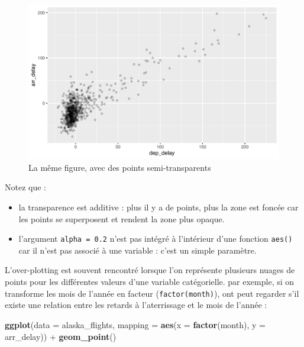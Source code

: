 \documentclass[a4paperpaper,]{article}
\newenvironment{Shaded}{\begin{snugshade}}{\end{snugshade}}
\newcommand{\DataTypeTok}[1]{\textcolor[rgb]{0.00,0.34,0.68}{#1}}
\newcommand{\KeywordTok}[1]{\textcolor[rgb]{0.12,0.11,0.11}{\textbf{#1}}}
\newcommand{\NormalTok}[1]{\textcolor[rgb]{0.12,0.11,0.11}{#1}}
\newcommand{\OperatorTok}[1]{\textcolor[rgb]{0.12,0.11,0.11}{#1}}
\newcommand{\StringTok}[1]{\textcolor[rgb]{0.75,0.01,0.01}{#1}}
\providecommand{\tightlist}{%
  \setlength{\itemsep}{0pt}\setlength{\parskip}{0pt}}
\theoremstyle{definition}
\theoremstyle{definition}
\theoremstyle{definition}
\theoremstyle{remark}
\begin{document}
\begin{figure}[htpb]

{\centering \includegraphics[width=0.9\linewidth]{figure/unnamed-chunk-40-1} 

}

\caption{La même figure, avec des points semi-transparents}\label{fig:unnamed-chunk-40}
\end{figure}

Notez que :

\begin{itemize}
\tightlist
\item
  la transparence est additive : plus il y a de points, plus la zone est
  foncée car les points se superposent et rendent la zone plus opaque.
\item
  l'argument \texttt{alpha\ =\ 0.2} n'est pas intégré à l'intérieur
  d'une fonction \texttt{aes()} car il n'est pas associé à une variable
  : c'est un simple paramètre.
\end{itemize}

L'over-plotting est souvent rencontré lorsque l'on représente plusieurs
nuages de points pour les différentes valeurs d'une variable
catégorielle. par exemple, si on transforme les mois de l'année en
facteur (\texttt{factor(month)}), ont peut regarder s'il existe une
relation entre les retards à l'aterrissage et le mois de l'année :

\begin{Shaded}
\begin{Highlighting}[]
\KeywordTok{ggplot}\NormalTok{(}\DataTypeTok{data =}\NormalTok{ alaska_flights, }\DataTypeTok{mapping =} \KeywordTok{aes}\NormalTok{(}\DataTypeTok{x =} \KeywordTok{factor}\NormalTok{(month), }\DataTypeTok{y =}\NormalTok{ arr_delay)) }\OperatorTok{+}
\StringTok{  }\KeywordTok{geom_point}\NormalTok{()}
\end{Highlighting}
\end{Shaded}
\end{document}
